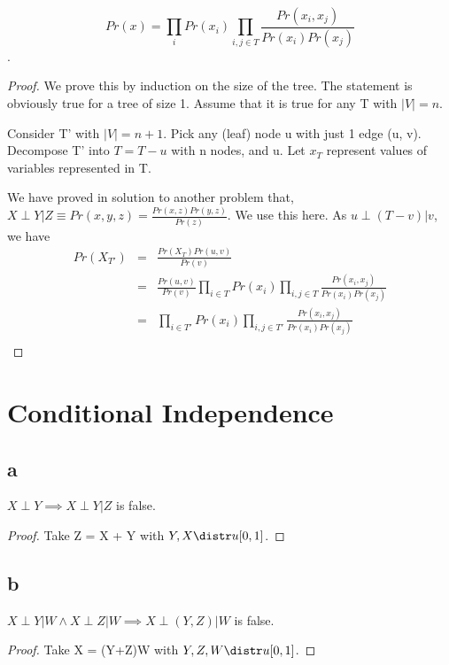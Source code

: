 \documentclass{article}
\begin{document}
\begin{thm}
$$Pr(x) = \prod_i Pr(x_i) \prod_{i,j \in T}\frac{Pr(x_i, x_j)}{Pr(x_i)Pr(x_j)}$$.
\end{thm}
\begin{proof}
We prove this by induction on the size of the tree. The statement is obviously true for a tree of size 1. Assume that it is true for any T with $|V| = n$.

Consider T' with $|V| = n+1$. Pick any (leaf) node u with just 1 edge (u, v). Decompose T' into $T = T - u$ with n nodes, and u. Let $x_{T}$ represent values of variables represented in T.

We have proved in solution to another problem that, \\
$X \perp Y|Z \equiv Pr(x, y, z) = \frac{Pr(x, z)Pr(y, z)}{Pr(z)}$. We use this here. As $u \perp (T-v)|v$, we have 
\begin{eqnarray*}
Pr(X_{T'}) &=& \frac{Pr(X_T)Pr(u,v)}{Pr(v)} \\
&=& \frac{Pr(u, v)}{Pr(v)}\prod_{i \in T} Pr(x_i) \prod_{i,j \in T}\frac{Pr(x_i, x_j)}{Pr(x_i)Pr(x_j)} \\
&=& \prod_{i \in T'} Pr(x_i) \prod_{i,j \in T'}\frac{Pr(x_i, x_j)}{Pr(x_i)Pr(x_j)} \\
\end{eqnarray*}

\end{proof}


\section{Conditional Independence}
\subsection{a}
\begin{claim}
$X \perp Y \implies X \perp Y|Z$ is false.
\end{claim}
\begin{proof}
Take Z = X + Y with $Y, X \distr u[0,1]$.
\end{proof}


\subsection{b}
\begin{claim}
$X \perp Y|W \land X \perp Z|W \implies X \perp (Y, Z)|W$ is false.
\end{claim}
\begin{proof}
Take X = (Y+Z)W with $Y, Z, W \distr u[0,1]$.
\end{proof}
\end{document}
